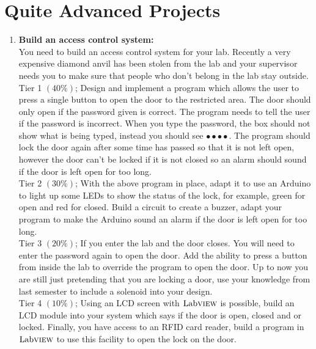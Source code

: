 \section{Quite Advanced Projects}
\begin{enumerate}
	\item \textbf{Build an access control system:}\\
	You need to build an access control system for your lab. Recently a very expensive diamond anvil has been stolen from the lab and your supervisor needs you to make sure that people who don't belong in the lab stay outside. \\
	
	Tier 1 $\left(40\%\right)$; Design and implement a program which allows the user to press a single button to open the door to the restricted area. The door should only open if the password given is correct. The program needs to tell the user if the password is incorrect. When you type the password, the box should not show what is being typed, instead you should see $\bullet\bullet\bullet\bullet$. The program should lock the door again after some time has passed so that it is not left open, however the door can't be locked if it is not closed so an alarm should sound if the door is left open for too long.\\
	
	 Tier 2 $\left(30\%\right)$; With the above program in place, adapt it to use an Arduino to light up some LEDs to show the status of the lock, for example, green for open and red for closed. Build a circuit to create a buzzer, adapt your program to make the Arduino sound an alarm if the door is left open for too long.\\
	 
	  Tier 3 $\left(20\%\right)$; If you enter the lab and the door closes. You will need to enter the password again to open the door. Add the ability to press a button from inside the lab to override the program to open the door. Up to now you are still just pretending that you are locking a door, use your knowledge from last semester to include a solenoid into your design.\\
	  
	  Tier 4 $\left(10\%\right)$; Using an LCD screen with $\text{Lab}\textsc{view}$ is possible, build an LCD module into your system which says if the door is open, closed and or locked. Finally, you have access to an RFID card reader, build a program in $\text{Lab}\textsc{view}$ to use this facility to open the lock on the door.\\
	  

\end{enumerate}
